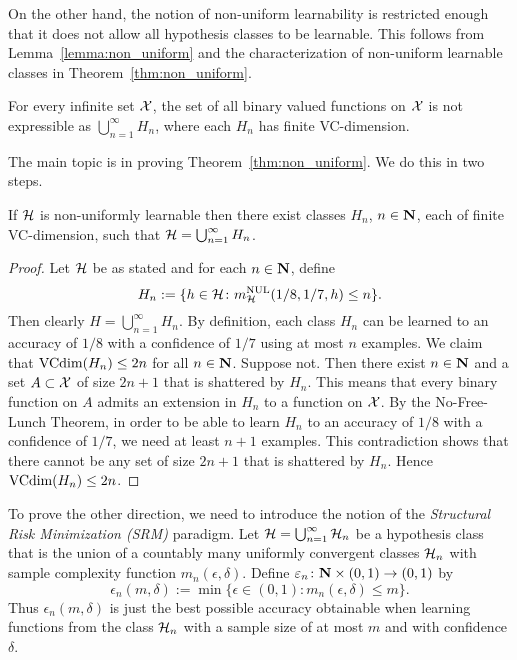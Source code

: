On the other hand, the notion of non-uniform learnability is restricted enough
that it does not allow all hypothesis classes to be learnable. This follows
from Lemma~\ref{lemma:non_uniform} and the characterization of non-uniform
learnable classes in Theorem~\ref{thm:non_uniform}.

\begin{lemma}\label{lemma:non_uniform}
For every infinite set $\mathcal{X}$, the set of all binary valued functions on $\mathcal{X}$ is
not expressible as $\bigcup_{n = 1}^{\infty} H_n$, where each $H_n$ has finite VC-dimension.
\end{lemma}

The main topic is in proving Theorem~\ref{thm:non_uniform}. We do this in two steps.
\begin{lemma}\label{lemma:if_side}
If $\mathcal{H}$ is non-uniformly learnable then there exist classes $H_n$, $n \in \mathbf{N}$, each
of finite VC-dimension, such that $\mathcal{H} = \bigcup_{n = 1}^{\infty} H_n$.
\end{lemma}
\begin{proof}
Let $\mathcal{H}$ be as stated and for each $n \in \mathbf{N}$, define
\[
    H_n := \{h \in \mathcal{H} \colon m_{\mathcal{H}}^{\text{NUL}} (1/8, 1/7, h) \leq n\}.
\]
Then clearly $H = \bigcup_{n = 1}^{\infty} H_n$. By definition, each class $H_n$
can be learned to an accuracy of $1/8$ with a confidence of $1/7$ using at most $n$
examples. We claim that $\text{VCdim} (H_n) \leq 2n$ for all
$n \in \mathbf{N}$. Suppose not. Then there exist $n \in \mathbf{N}$ and a set $A \subset \mathcal{X}$ of size
$2n + 1$ that is shattered by $H_n$. This means that every binary function on $A$ admits
an extension in $H_n$ to a function on $\mathcal{X}$. By the No-Free-Lunch Theorem, in order
to be able to learn $H_n$ to an accuracy of $1/8$ with a confidence of $1/7$, we need
at least $n + 1$ examples. This contradiction shows that there cannot be any set
of size $2n + 1$ that is shattered by $H_n$. Hence $\text{VCdim} (H_n) \leq 2n$.
\qedhere
\end{proof}


To prove the other direction, we need to introduce the notion of the \emph{Structural
Risk Minimization (SRM)} paradigm. Let $\mathcal{H} = \bigcup_{n = 1}^{\infty} \mathcal{H}_n$
be a hypothesis class that is the union of a countably many uniformly convergent
classes $\mathcal{H}_n$ with sample complexity function
$m_n (\epsilon, \delta)$. Define $\varepsilon_n \colon \mathbf{N} \times (0, 1) \rightarrow (0, 1)$
by
\[
    \epsilon_n (m, \delta) :=
        \min \{\epsilon \in (0, 1) \colon m_n (\epsilon, \delta) \leq m\}.
\]
Thus $\epsilon_n (m, \delta)$ is just the best possible accuracy obtainable
when learning functions from the class $\mathcal{H}_n$ with a sample size of
at most $m$ and with confidence $\delta$.

